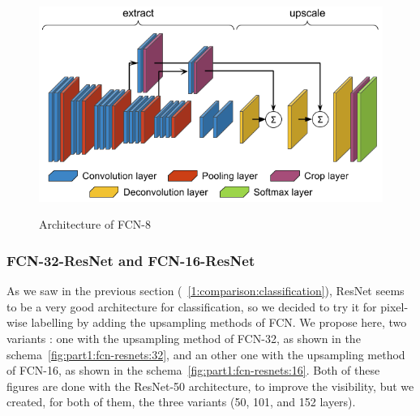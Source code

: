 \begin{figure}[ht!]
  \includegraphics[width=0.9\linewidth,center]{images/part1/fcn8_architecture}
  \caption{Architecture of FCN-8}\textbf{
  \label{fig:part1:fcn8_architecture}}
\end{figure}


\subsubsection{FCN-32-ResNet and FCN-16-ResNet} As we saw in the previous section (~\ref{1:comparison:classification}), ResNet seems to be a very good architecture for classification, so we decided to try it for pixel-wise labelling by adding the upsampling methods of FCN. We propose here, two variants : one with the upsampling method of FCN-32, as shown in the schema~\ref{fig:part1:fcn-resnets:32}, and an other one with the upsampling method of FCN-16, as shown in the schema~\ref{fig:part1:fcn-resnets:16}. Both of these figures are done with the ResNet-50 architecture, to improve the visibility, but we created, for both of them, the three variants (50, 101, and 152 layers).

